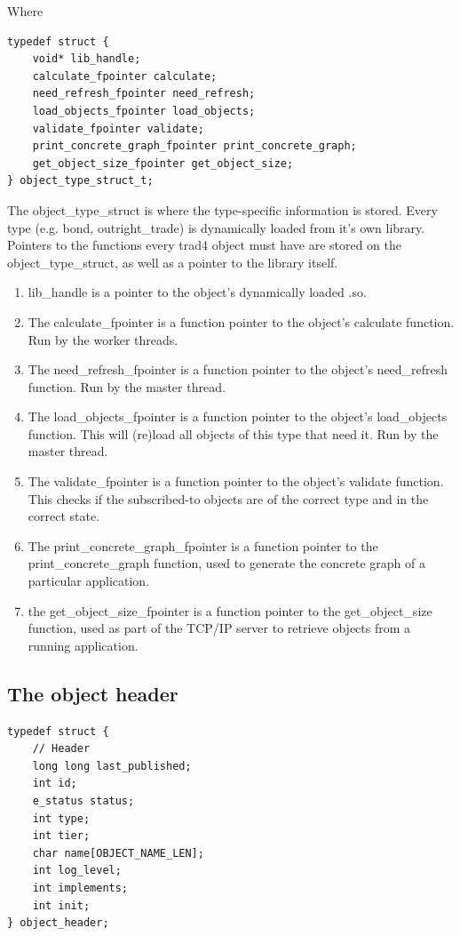 \documentclass{report}
\begin{document}
Where

\begin{verbatim}
typedef struct {
    void* lib_handle;
    calculate_fpointer calculate;
    need_refresh_fpointer need_refresh;
    load_objects_fpointer load_objects;
    validate_fpointer validate;
    print_concrete_graph_fpointer print_concrete_graph;
    get_object_size_fpointer get_object_size;
} object_type_struct_t;
\end{verbatim}

The object_type_struct is where the type-specific information is stored. Every type (e.g. bond, outright_trade) is dynamically loaded from it's own library. Pointers to the functions every trad4 object must have are stored on the object_type_struct, as well as a pointer to the library itself.  

\begin{enumerate}
\item lib_handle is a pointer to the object's dynamically loaded .so.
\item The calculate_fpointer is a function pointer to the object's calculate function. Run by the worker 
threads.
\item The need_refresh_fpointer is a function pointer to the object's need_refresh function. Run by the master thread.
\item The load_objects_fpointer is a function pointer to the object's load_objects function. This will (re)load all objects of this type that need it. Run by the master thread.
\item The validate_fpointer is a function pointer to the object's validate function. This checks if the subscribed-to objects are of the correct type and in the correct state.
\item The print_concrete_graph_fpointer is a function pointer to the print_concrete_graph function, used to generate the concrete graph of a particular application.
\item the get_object_size_fpointer is a function pointer to the get_object_size function, used as part of the TCP/IP server to retrieve objects from a running application.
\end{enumerate}

\subsection{The object header}

\begin{verbatim}
typedef struct {
    // Header
    long long last_published;
    int id;
    e_status status;
    int type;
    int tier;
    char name[OBJECT_NAME_LEN];
    int log_level;
    int implements;
    int init;
} object_header;
\end{verbatim}
\end{document}
